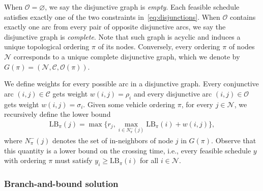 \documentclass{article}
\theoremstyle{definition}
\theoremstyle{plain}
\begin{document}
When $\mathcal{O} = \varnothing$, we say the disjunctive graph is
\textit{empty}. Each feasible schedule satisfies exactly one of the two
constraints in~\eqref{eq:disjunctions}. When $\mathcal{O}$ contains exactly one arc from every pair
of opposite disjunctive arcs, we say the disjunctive graph is \textit{complete}.
Note that such graph is acyclic and induces a unique topological ordering $\pi$
of its nodes. Conversely, every ordering $\pi$ of nodes $\mathcal{N}$ corresponds
to a unique complete disjunctive graph, which we denote by
$G(\pi) = (\mathcal{N}, \mathcal{C}, \mathcal{O}(\pi))$.

We define weights for every possible arc in a disjunctive graph. Every
conjunctive arc $(i, j) \in \mathcal{C}$ gets weight $w(i,j) = \rho_{i}$ and every
disjunctive arc $(i, j) \in \mathcal{O}$ gets weight $w(i,j) = \sigma_{i}$. Given
some vehicle ordering $\pi$, for every $j \in \mathcal{N}$, we recursively define
the lower bound
\begin{align}
  \text{LB}_\pi(j) = \max\{ r_{j}, \max_{i \in N^{-}_{\pi}(j)} \text{LB}_\pi(i) + w(i,j) \} ,
\end{align}
where $N^{-}_{\pi}(j)$ denotes the set of in-neighbors of node $j$ in $G(\pi)$.
Observe that this quantity is a lower bound on the crossing time, i.e., every
feasible schedule $y$ with ordering $\pi$ must satisfy $y_{i} \geq \text{LB}_\pi(i)$
for all $i \in \mathcal{N}$.


\subsubsection{Branch-and-bound solution}
\end{document}
